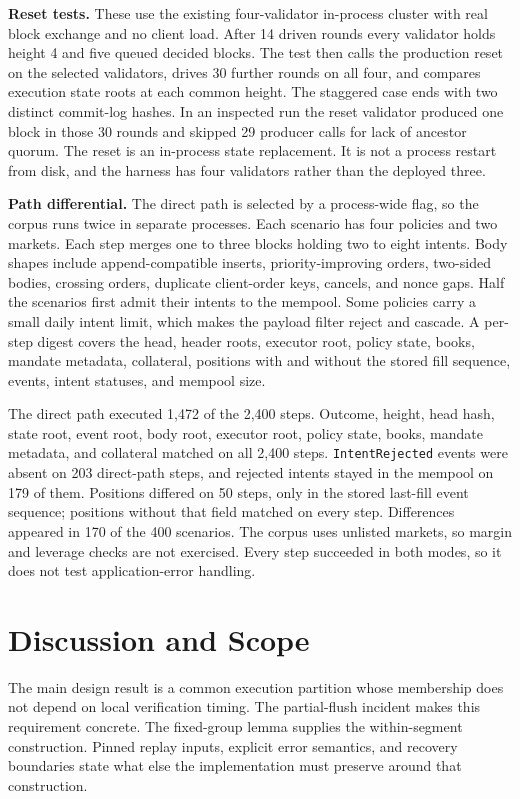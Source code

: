 \documentclass[11pt]{article}
\begin{document}
\textbf{Reset tests.} These use the existing four-validator in-process cluster with real block exchange and no client load. After 14 driven rounds every validator holds height 4 and five queued decided blocks. The test then calls the production reset on the selected validators, drives 30 further rounds on all four, and compares execution state roots at each common height. The staggered case ends with two distinct commit-log hashes. In an inspected run the reset validator produced one block in those 30 rounds and skipped 29 producer calls for lack of ancestor quorum. The reset is an in-process state replacement. It is not a process restart from disk, and the harness has four validators rather than the deployed three. \cite{R30}

\textbf{Path differential.} The direct path is selected by a process-wide flag, so the corpus runs twice in separate processes. Each scenario has four policies and two markets. Each step merges one to three blocks holding two to eight intents. Body shapes include append-compatible inserts, priority-improving orders, two-sided bodies, crossing orders, duplicate client-order keys, cancels, and nonce gaps. Half the scenarios first admit their intents to the mempool. Some policies carry a small daily intent limit, which makes the payload filter reject and cascade. A per-step digest covers the head, header roots, executor root, policy state, books, mandate metadata, collateral, positions with and without the stored fill sequence, events, intent statuses, and mempool size. \cite{R30}

The direct path executed 1,472 of the 2,400 steps. Outcome, height, head hash, state root, event root, body root, executor root, policy state, books, mandate metadata, and collateral matched on all 2,400 steps. \texttt{IntentRejected} events were absent on 203 direct-path steps, and rejected intents stayed in the mempool on 179 of them. Positions differed on 50 steps, only in the stored last-fill event sequence; positions without that field matched on every step. Differences appeared in 170 of the 400 scenarios. The corpus uses unlisted markets, so margin and leverage checks are not exercised. Every step succeeded in both modes, so it does not test application-error handling. \cite{R30}

\section{Discussion and Scope}
The main design result is a common execution partition whose membership does not depend on local verification timing. The partial-flush incident makes this requirement concrete. The fixed-group lemma supplies the within-segment construction. Pinned replay inputs, explicit error semantics, and recovery boundaries state what else the implementation must preserve around that construction.
\end{document}
